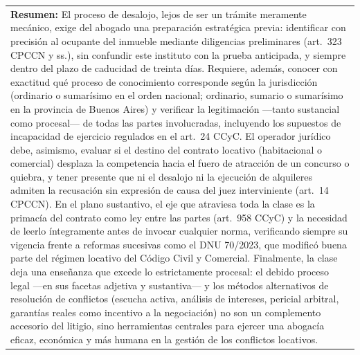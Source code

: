 \documentclass[12pt,oneside]{book}
\begin{document}
\begin{longtable}{p{} p{}}
\midrule
\multicolumn{2}{p{0.90\textwidth}}{
\textbf{Resumen:} El proceso de desalojo, lejos de ser un trámite meramente mecánico, exige del abogado una preparación estratégica previa: identificar con precisión al ocupante del inmueble mediante diligencias preliminares (art.\ 323 CPCCN y ss.), sin confundir este instituto con la prueba anticipada, y siempre dentro del plazo de caducidad de treinta días. Requiere, además, conocer con exactitud qué proceso de conocimiento corresponde según la jurisdicción (ordinario o sumarísimo en el orden nacional; ordinario, sumario o sumarísimo en la provincia de Buenos Aires) y verificar la legitimación —tanto sustancial como procesal— de todas las partes involucradas, incluyendo los supuestos de incapacidad de ejercicio regulados en el art.\ 24 CCyC. El operador jurídico debe, asimismo, evaluar si el destino del contrato locativo (habitacional o comercial) desplaza la competencia hacia el fuero de atracción de un concurso o quiebra, y tener presente que ni el desalojo ni la ejecución de alquileres admiten la recusación sin expresión de causa del juez interviniente (art.\ 14 CPCCN). En el plano sustantivo, el eje que atraviesa toda la clase es la primacía del contrato como ley entre las partes (art.\ 958 CCyC) y la necesidad de leerlo íntegramente antes de invocar cualquier norma, verificando siempre su vigencia frente a reformas sucesivas como el DNU 70/2023, que modificó buena parte del régimen locativo del Código Civil y Comercial. Finalmente, la clase deja una enseñanza que excede lo estrictamente procesal: el debido proceso legal —en sus facetas adjetiva y sustantiva— y los métodos alternativos de resolución de conflictos (escucha activa, análisis de intereses, pericial arbitral, garantías reales como incentivo a la negociación) no son un complemento accesorio del litigio, sino herramientas centrales para ejercer una abogacía eficaz, económica y más humana en la gestión de los conflictos locativos.
} \\

\end{longtable}
\end{document}
